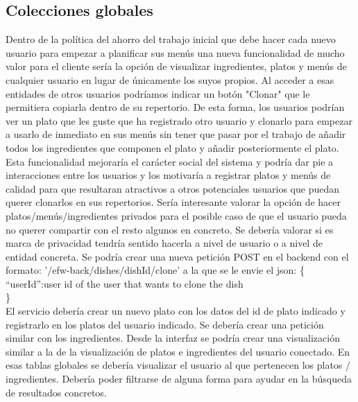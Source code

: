 \documentclass[12pt, a4paper, twoside]{book}
\begin{document}
	\subsection{Colecciones globales}
	Dentro de la política del ahorro del trabajo inicial que debe hacer cada nuevo usuario para empezar a planificar sus menús una nueva funcionalidad de mucho valor para el cliente sería la opción de visualizar ingredientes, platos y menús de cualquier usuario en lugar de únicamente los suyos propios. Al acceder a esas entidades de otros usuarios podríamos indicar un botón "Clonar" que le permitiera copiarla dentro de su repertorio. De esta forma, los usuarios podrían ver un plato que les guste que ha registrado otro usuario y clonarlo para empezar a usarlo de inmediato en sus menús sin tener que pasar por el trabajo de añadir todos los ingredientes que componen el plato y añadir posteriormente el plato.
	Esta funcionalidad mejoraría el carácter social del sistema y podría dar pie a interacciones entre los usuarios y los motivaría a registrar platos y menús de calidad para que resultaran atractivos a otros potenciales usuarios que puedan querer clonarlos en sus repertorios. Sería interesante valorar la opción de hacer platos/menús/ingredientes privados para el posible caso de que el usuario pueda no querer compartir con el resto algunos en concreto. Se debería valorar si es marca de privacidad tendría sentido hacerla a nivel de usuario o a nivel de entidad concreta.
	Se podría crear una nueva petición POST en el backend con el formato: '/efw-back/dishes/dishId/clone' a la que se le envie el json:
	\{\\
		``userId'':user id of the user that wants to clone the dish\\
	\}\\
	El servicio debería crear un nuevo plato con los datos del id de plato indicado y registrarlo en los platos del usuario indicado. Se debería crear una petición similar con los ingredientes. Desde la interfaz se podría crear una visualización similar a la de la visualización de platos e ingredientes del usuario conectado. En esas tablas globales se debería visualizar el usuario al que pertenecen los platos / ingredientes. Debería poder filtrarse de alguna forma para ayudar en la búsqueda de resultados concretos.
\end{document}

